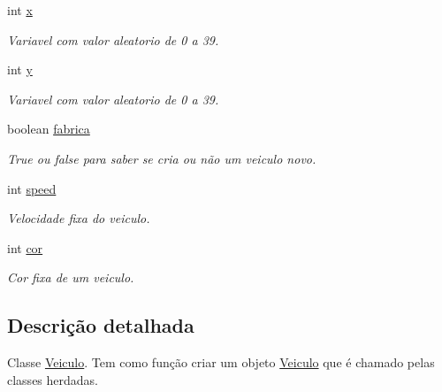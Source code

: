 \begin{DoxyCompactItemize}
\item 
\mbox{\label{class_veiculo_a069917a284297fe5b385258b2afd9ad6}} 
int \mbox{\hyperlink{class_veiculo_a069917a284297fe5b385258b2afd9ad6}{x}}
\begin{DoxyCompactList}\small\item\em Variavel com valor aleatorio de 0 a 39. \end{DoxyCompactList}\item 
\mbox{\label{class_veiculo_af25046404db7c2786c0d9e468bb1fb64}} 
int \mbox{\hyperlink{class_veiculo_af25046404db7c2786c0d9e468bb1fb64}{y}}
\begin{DoxyCompactList}\small\item\em Variavel com valor aleatorio de 0 a 39. \end{DoxyCompactList}\item 
\mbox{\label{class_veiculo_a23d377a69bdf558ebedb5bc35dcdebf5}} 
boolean \mbox{\hyperlink{class_veiculo_a23d377a69bdf558ebedb5bc35dcdebf5}{fabrica}}
\begin{DoxyCompactList}\small\item\em True ou false para saber se cria ou não um veiculo novo. \end{DoxyCompactList}\item 
\mbox{\label{class_veiculo_a9a2aef79ea401cf44fd8102e75e4a2de}} 
int \mbox{\hyperlink{class_veiculo_a9a2aef79ea401cf44fd8102e75e4a2de}{speed}}
\begin{DoxyCompactList}\small\item\em Velocidade fixa do veiculo. \end{DoxyCompactList}\item 
\mbox{\label{class_veiculo_aad500265aeb92689ca66ec5bd87787a9}} 
int \mbox{\hyperlink{class_veiculo_aad500265aeb92689ca66ec5bd87787a9}{cor}}
\begin{DoxyCompactList}\small\item\em Cor fixa de um veiculo. \end{DoxyCompactList}\end{DoxyCompactItemize}


\subsection{Descrição detalhada}
Classe \mbox{\hyperlink{class_veiculo}{Veiculo}}. Tem como função criar um objeto \mbox{\hyperlink{class_veiculo}{Veiculo}} que é chamado pelas classes herdadas. 

